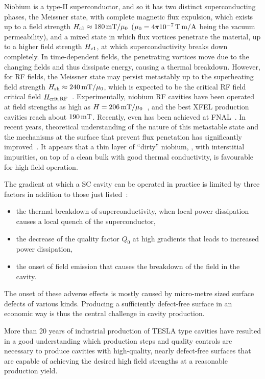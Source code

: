 Niobium is a type-II superconductor, and so it has two distinct superconducting phases, the Meissner state, with complete magnetic flux expulsion, which exists up to a field strength $H_{\mathrm{c1}} \approx 180\,{\mathrm{mT}}/\mu_0$ ($\mu_0 = 4\pi 10^{-7}\,{\mathrm{T\,m/A}}$ being the vacuum permeability), and a mixed state in which flux vortices penetrate the material, up to a higher field strength $H_{\mathrm{c1}}$, at which superconductivity breaks down completely.
In time-dependent fields, the penetrating vortices move due to the changing fields and thus dissipate energy, causing a thermal breakdown. 
However, for RF fields, the Meissner state may persist metastably up to the superheating field strength $H_{\mathrm{sh}} \approx 240\,{\mathrm{mT}}/\mu_0$, which is expected to be the critical RF field critical field $H_{\mathrm{crit,RF}}$~\cite{Padamsee:1998vf}.
Experimentally, niobium RF cavities have been operated at field strengths as high as $H=206\,{\mathrm{mT}}/\mu_0$~\cite{Eremeev:2007zza}, and the best XFEL production cavities reach about $190\,{\mathrm{mT}}$.
Recently, even  has been achieved at FNAL~\cite{Grassellino:2018tqg}.
In recent years, theoretical understanding of the nature of this metastable state and the mechanisms at the surface that prevent flux penetation has significantly improved~\cite{Gurevich:2017vnn,Kubo:2017cww}.
It appears that a thin layer of ``dirty'' niobium, \ie,  with interstitial impurities, on top of a clean bulk with good thermal conductivity, is favourable for high field operation.  

The gradient at which a SC cavity can be operated in practice is limited by three factors   in addition to those just listed~\cite{Padamsee:1998vf}:
\begin{itemize}
\item the thermal breakdown of superconductivity, when local power dissipation causes a local quench of the superconductor,
\item the decrease of the quality factor $Q_0$ at high gradients that leads to increased power dissipation,
\item the onset of field emission that causes the breakdown of the field in the cavity.
\end{itemize}
The onset of these adverse effects is mostly caused by micro-metre sized surface defects of various kinds. 
Producing a sufficiently defect-free surface in an economic way is thus the central challenge in cavity production.

More than 20 years of industrial production of TESLA type cavities have resulted in a good understanding which production steps  and quality controls are necessary to produce cavities with high-quality, nearly defect-free surfaces that are capable of achieving the desired high field strengths at a reasonable production yield.


